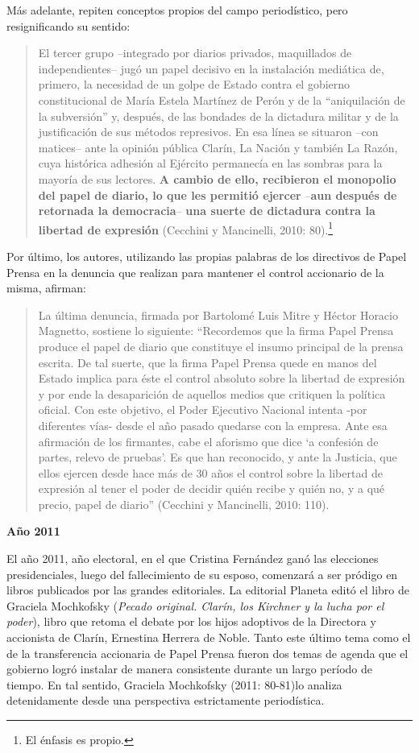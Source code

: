 Más adelante, repiten conceptos propios del campo periodístico, pero resignificando su sentido:

\begin{quote}
El tercer grupo --integrado por diarios privados, maquillados de independientes-- jugó un papel decisivo en la instalación mediática de, primero, la necesidad de un golpe de Estado contra el gobierno constitucional de María Estela Martínez de Perón y de la \enquote{aniquilación de la subversión} y, después, de las bondades de la dictadura militar y de la justificación de sus métodos represivos. En esa línea se situaron --con matices-- ante la opinión pública Clarín, La Nación y también La Razón, cuya histórica adhesión al Ejército permanecía en las sombras para la mayoría de sus lectores. \textbf{A cambio de ello, recibieron el monopolio del papel de diario, lo que les permitió ejercer} --\textbf{aun después de retornada la democracia}-- \textbf{una suerte de dictadura contra la libertad de expresión} (Cecchini y Mancinelli, 2010: 80).\footnote{El énfasis es propio.}
\end{quote}

Por último, los autores, utilizando las propias palabras de los directivos de Papel Prensa en la denuncia que realizan para mantener el control accionario de la misma, afirman:

\begin{quote}
La última denuncia, firmada por Bartolomé Luis Mitre y Héctor Horacio Magnetto, sostiene lo siguiente: \enquote{Recordemos que la firma Papel Prensa produce el papel de diario que constituye el insumo principal de la prensa escrita. De tal suerte, que la firma Papel Prensa quede en manos del Estado implica para éste el control absoluto sobre la libertad de expresión y por ende la desaparición de aquellos medios que critiquen la política oficial. Con este objetivo, el Poder Ejecutivo Nacional intenta -por diferentes vías- desde el año pasado quedarse con la empresa. Ante esa afirmación de los firmantes, cabe el aforismo que dice \enquote{a confesión de partes, relevo de pruebas}. Es que han reconocido, y ante la Justicia, que ellos ejercen desde hace más de 30 años el control sobre la libertad de expresión al tener el poder de decidir quién recibe y quién no, y a qué precio, papel de diario} (Cecchini y Mancinelli, 2010: 110).
\end{quote}

\textbf{Año 2011}

El año 2011, año electoral, en el que Cristina Fernández ganó las elecciones presidenciales, luego del fallecimiento de su esposo, comenzará a ser pródigo en libros publicados por las grandes editoriales. La editorial Planeta editó el libro de Graciela Mochkofsky (\emph{Pecado original. Clarín, los Kirchner y la lucha por el poder}), libro que retoma el debate por los hijos adoptivos de la Directora y accionista de Clarín, Ernestina Herrera de Noble. Tanto este último tema como el de la transferencia accionaria de Papel Prensa fueron dos temas de agenda que el gobierno logró instalar de manera consistente durante un largo período de tiempo. En tal sentido, Graciela Mochkofsky (2011: 80-81)lo analiza detenidamente desde una perspectiva estrictamente periodística.


